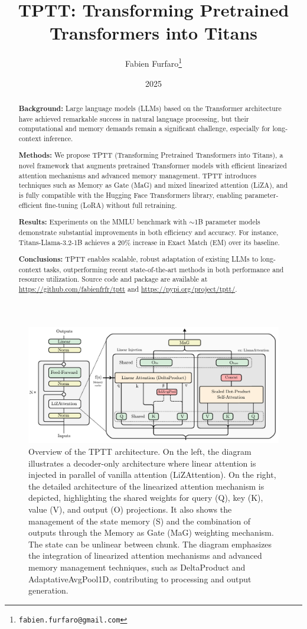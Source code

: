 \documentclass[10pt,a4paper]{article}
\title{\Large\textbf{TPTT: Transforming Pretrained Transformers into Titans}}
\author{\large Fabien Furfaro\thanks{\texttt{fabien.furfaro@gmail.com}}}
\date{\large 2025}
\begin{document}
\maketitle

\begin{abstract}
    \textbf{Background:} Large language models (LLMs) based on the Transformer architecture have achieved remarkable success in natural language processing, but their computational and memory demands remain a significant challenge, especially for long-context inference. 
    
    \textbf{Methods:} We propose TPTT (Transforming Pretrained Transformers into Titans), a novel framework that augments pretrained Transformer models with efficient linearized attention mechanisms and advanced memory management. TPTT introduces techniques such as Memory as Gate (MaG) and mixed linearized attention (LiZA), and is fully compatible with the Hugging Face Transformers library, enabling parameter-efficient fine-tuning (LoRA) without full retraining.
    
    \textbf{Results:} Experiments on the MMLU benchmark with $\sim$1B parameter models demonstrate substantial improvements in both efficiency and accuracy. For instance, Titans-Llama-3.2-1B achieves a 20\% increase in Exact Match (EM) over its baseline.
    
    \textbf{Conclusions:} TPTT enables scalable, robust adaptation of existing LLMs to long-context tasks, outperforming recent state-of-the-art methods in both performance and resource utilization. Source code and package are available at \url{https://github.com/fabienfrfr/tptt} and \url{https://pypi.org/project/tptt/}.
\end{abstract}
    


\begin{figure}[ht]
    \centering
    \includegraphics[width=0.8\linewidth]{fig.pdf}
    \caption{Overview of the TPTT architecture. On the left, the diagram illustrates a decoder-only architecture where linear attention is injected in parallel of vanilla attention (LiZAttention). On the right, the detailed architecture of the linearized attention mechanism is depicted, highlighting the shared weights for query (Q), key (K), value (V), and output (O) projections. It also shows the management of the state memory (S) and the combination of outputs through the Memory as Gate (MaG) weighting mechanism. The state can be unlinear between chunk. The diagram emphasizes the integration of linearized attention mechanisms and advanced memory management techniques, such as DeltaProduct and AdaptativeAvgPool1D, contributing to processing and output generation.}
    \label{fig:approach_overview}
\end{figure}
\end{document}
